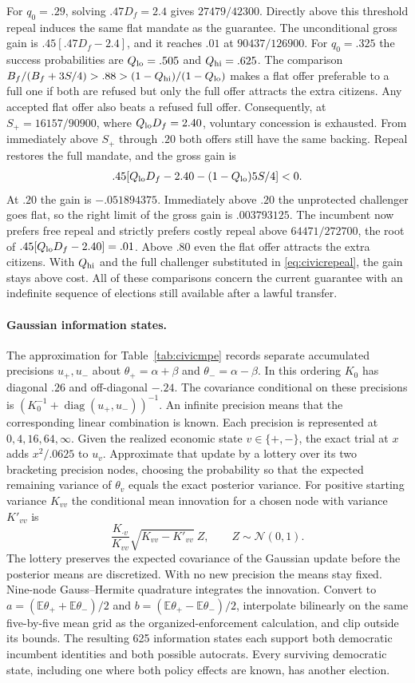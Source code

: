 \documentclass[11pt,letterpaper]{article}
\newcommand{\E}{\mathbb E}
\begin{document}
For $q_0=.29$, solving $.47D_f=2.4$ gives $27479/42300$. Directly above this threshold repeal induces the same flat mandate as the guarantee. The unconditional gross gain is $.45[.47D_f-2.4]$, and it reaches $.01$ at $90437/126900$. For $q_0=.325$ the success probabilities are $Q_{\rm lo}=.505$ and $Q_{\rm hi}=.625$. The comparison $B_f/(B_f+3S/4)>.88>(1-Q_{\rm hi})/(1-Q_{\rm lo})$ makes a flat offer preferable to a full one if both are refused but only the full offer attracts the extra citizens. Any accepted flat offer also beats a refused full offer. Consequently, at $S_+=16157/90900$, where $Q_{\rm lo}D_f=2.40$, voluntary concession is exhausted. From immediately above $S_+$ through $.20$ both offers still have the same backing. Repeal restores the full mandate, and the gross gain is
\[
 .45[Q_{\rm lo}D_f-2.40-(1-Q_{\rm lo})5S/4]<0.
\]
At $.20$ the gain is $-.051894375$. Immediately above $.20$ the unprotected challenger goes flat, so the right limit of the gross gain is $.003793125$. The incumbent now prefers free repeal and strictly prefers costly repeal above $64471/272700$, the root of $.45[Q_{\rm lo}D_f-2.40]=.01$. Above $.80$ even the flat offer attracts the extra citizens. With $Q_{\rm hi}$ and the full challenger substituted in \eqref{eq:civicrepeal}, the gain stays above cost. All of these comparisons concern the current guarantee with an indefinite sequence of elections still available after a lawful transfer.

\paragraph{Gaussian information states.}
The approximation for Table~\ref{tab:civicmpe} records separate accumulated precisions $u_+,u_-$ about $\theta_+=\alpha+\beta$ and $\theta_-=\alpha-\beta$. In this ordering $K_0$ has diagonal $.26$ and off-diagonal $-.24$. The covariance conditional on these precisions is $(K_0^{-1}+\operatorname{diag}(u_+,u_-))^{-1}$. An infinite precision means that the corresponding linear combination is known. Each precision is represented at $0,4,16,64,\infty$. Given the realized economic state $v\in\{+,-\}$, the exact trial at $x$ adds $x^2/.0625$ to $u_v$. Approximate that update by a lottery over its two bracketing precision nodes, choosing the probability so that the expected remaining variance of $\theta_v$ equals the exact posterior variance. For positive starting variance $K_{vv}$ the conditional mean innovation for a chosen node with variance $K'_{vv}$ is
\[
 \frac{K_{\cdot v}}{K_{vv}}\sqrt{K_{vv}-K'_{vv}}\ Z,\qquad Z\sim\mathcal N(0,1).
\]
The lottery preserves the expected covariance of the Gaussian update before the posterior means are discretized. With no new precision the means stay fixed. Nine-node Gauss--Hermite quadrature integrates the innovation. Convert to $a=(\E\theta_++\E\theta_-)/2$ and $b=(\E\theta_+-\E\theta_-)/2$, interpolate bilinearly on the same five-by-five mean grid as the organized-enforcement calculation, and clip outside its bounds. The resulting 625 information states each support both democratic incumbent identities and both possible autocrats. Every surviving democratic state, including one where both policy effects are known, has another election.
\end{document}
